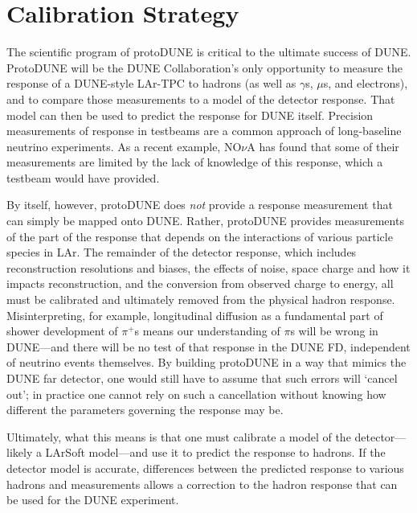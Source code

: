 
\section{Calibration Strategy}


	The scientific program of protoDUNE is critical to the ultimate success
of DUNE.  ProtoDUNE will be the DUNE Collaboration's only opportunity to
measure the response of a DUNE-style LAr-TPC to hadrons (as well as $\gamma$s,
$\mu$s, and electrons), and to compare those measurements to a model of the
detector response. That model can then be used to predict the response for DUNE
itself.  Precision measurements of response in testbeams are a common approach
of long-baseline neutrino experiments. As a recent example, NO{$\nu$}A has
found that some of their measurements are limited by the lack of knowledge of
this response, which a testbeam would have provided.
	
	By itself, however, protoDUNE does {\it not} provide a response
measurement that can simply be mapped onto DUNE.  Rather, protoDUNE provides
measurements of the part of the response that depends on the interactions of
various particle species in LAr.  The remainder of the detector response, which
includes reconstruction resolutions and biases, the effects of noise, space
charge and how it impacts reconstruction, and the conversion from observed
charge to energy, all must be calibrated and ultimately removed from the
physical hadron response.  Misinterpreting, for example, longitudinal diffusion
as a fundamental part of shower development of $\pi^+$s means our understanding
of $\pi$s will be wrong in DUNE---and there will be no test of that response in
the DUNE FD, independent of neutrino events themselves.  By building protoDUNE
in a way that mimics the DUNE far detector, one would still have to assume that such errors will
`cancel out';
 in practice one cannot rely on such a cancellation without knowing
how different the parameters governing the response may be.

	Ultimately, what this means is that one must calibrate a model of the
detector---likely a LArSoft model---and use it to predict the response to
hadrons.  If the detector model is accurate, differences between the predicted
response to various hadrons and measurements allows a correction to the hadron
response that can be used for the DUNE experiment.  

